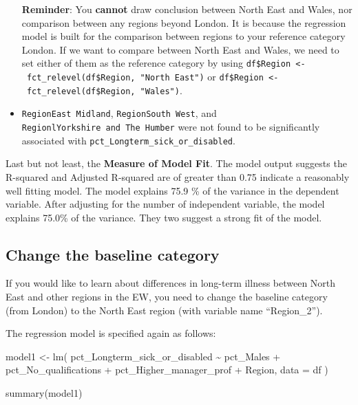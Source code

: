 \documentclass[
  letterpaper,
  DIV=11,
  numbers=noendperiod]{scrreprt}
\newenvironment{Shaded}{\begin{snugshade}}{\end{snugshade}}
\newcommand{\AttributeTok}[1]{\textcolor[rgb]{0.40,0.45,0.13}{#1}}
\newcommand{\FunctionTok}[1]{\textcolor[rgb]{0.28,0.35,0.67}{#1}}
\newcommand{\NormalTok}[1]{\textcolor[rgb]{0.00,0.23,0.31}{#1}}
\newcommand{\OtherTok}[1]{\textcolor[rgb]{0.00,0.23,0.31}{#1}}
\newcommand{\SpecialCharTok}[1]{\textcolor[rgb]{0.37,0.37,0.37}{#1}}
\newcommand{\StringTok}[1]{\textcolor[rgb]{0.13,0.47,0.30}{#1}}
\begin{document}
\begin{itemize}
  \textbf{Reminder}: You \textbf{cannot} draw conclusion between North
  East and Wales, nor comparison between any regions beyond London. It
  is because the regression model is built for the comparison between
  regions to your reference category London. If we want to compare
  between North East and Wales, we need to set either of them as the
  reference category by using
  \texttt{df\$Region\ \textless{}-\ fct\_relevel(df\$Region,\ "North\ East")}
  or
  \texttt{df\$Region\ \textless{}-\ fct\_relevel(df\$Region,\ "Wales")}.
\item
  \texttt{RegionEast\ Midland}, \texttt{RegionSouth\ West}, and
  \texttt{RegionlYorkshire\ and\ The\ Humber} were not found to be
  significantly associated with
  \texttt{pct\_Longterm\_sick\_or\_disabled}.
\end{itemize}

Last but not least, the \textbf{Measure of Model Fit}. The model output
suggests the R-squared and Adjusted R-squared are of greater than 0.75
indicate a reasonably well fitting model. The model explains 75.9 \% of
the variance in the dependent variable. After adjusting for the number
of independent variable, the model explains 75.0\% of the variance. They
two suggest a strong fit of the model.

\subsection{\texorpdfstring{\textbf{Change the baseline
category}}{Change the baseline category}}\label{change-the-baseline-category}

If you would like to learn about differences in long-term illness
between North East and other regions in the EW, you need to change the
baseline category (from London) to the North East region (with variable
name ``Region\_2'').

\begin{Shaded}
\end{Shaded}

The regression model is specified again as follows:

\begin{Shaded}
\begin{Highlighting}[]
\NormalTok{model1 }\OtherTok{\textless{}{-}} \FunctionTok{lm}\NormalTok{(}
\NormalTok{  pct\_Longterm\_sick\_or\_disabled }\SpecialCharTok{\textasciitilde{}}\NormalTok{ pct\_Males }\SpecialCharTok{+}\NormalTok{ pct\_No\_qualifications }\SpecialCharTok{+}\NormalTok{ pct\_Higher\_manager\_prof }\SpecialCharTok{+}\NormalTok{ Region,}
  \AttributeTok{data =}\NormalTok{ df}
\NormalTok{)}

\FunctionTok{summary}\NormalTok{(model1)}
\end{Highlighting}
\end{Shaded}
\end{document}
